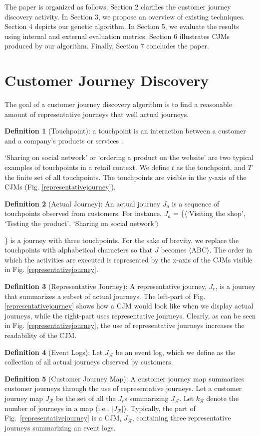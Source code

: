 \documentclass[runningheads]{llncs}
\begin{document}
The paper is organized as follows. Section 2 clarifies the customer journey discovery activity. In Section 3, we propose an overview of existing techniques. Section 4 depicts our genetic algorithm. In Section 5, we evaluate the results using internal and external evaluation metrics. Section 6 illustrates CJMs produced by our algorithm. Finally, Section 7 concludes the paper. 


\section{Customer Journey Discovery}
The goal of a customer journey discovery algorithm is to find a reasonable amount of representative journeys that well actual journeys. 

\textbf{Definition 1} (Touchpoint): a touchpoint is an interaction between a customer and a company's products or services \cite{bernard2017cjm}. {`Sharing on social network' or `ordering a product on the website' are two typical examples of touchpoints in a retail context. We define $t$ as the touchpoint, and $T$ the finite set of all touchpoints. The touchpoints are visible in the y-axis of the CJMs (Fig. \ref{representativejourney}).

\textbf{Definition 2} (Actual Journey): An actual journey $J_a$ is a sequence of touchpoints observed from customers. For instance, $J_a$ = \{$\langle$`Visiting the shop', `Testing the product', `Sharing on social network'$\rangle$}\} is a journey with three touchpoints. For the sake of brevity, we replace the touchpoints with alphabetical characters so that $J$ becomes $\langle$ABC$\rangle$. The order in which the activities are executed is represented by the x-axis of the CJMs visible in Fig. \ref{representativejourney}.

\textbf{Definition 3} (Representative Journey): A representative journey, $J_{r}$, is a journey that summarizes a subset of actual journeys. The left-part of Fig. \ref{representativejourney} shows how a CJM would look like when we display actual journeys, while the right-part uses representative journeys. Clearly, as can be seen in Fig. \ref{representativejourney}, the use of  representative journeys increases the readability of the CJM. 

\textbf{Definition 4} (Event Logs): Let $J_{\mathcal{A}}$ be an event log, which we define as the collection of all actual journeys observed by customers. 

\textbf{Definition 5} (Customer Journey Map): A customer journey map summarizes customer journeys through the use of representative journeys. Let a customer journey map $J_{\mathcal{R}}$ be the set of all the $J_{r}$s summarizing $J_{\mathcal{A}}$. Let $k_{\mathcal{R}}$ denote the number of journeys in a map (i.e., $|J_{\mathcal{R}}|$). Typically, the part  of Fig.~\ref{representativejourney} is a CJM, $J_{\mathcal{R}}$, containing three representative journeys summarizing an event logs.
\end{document}
